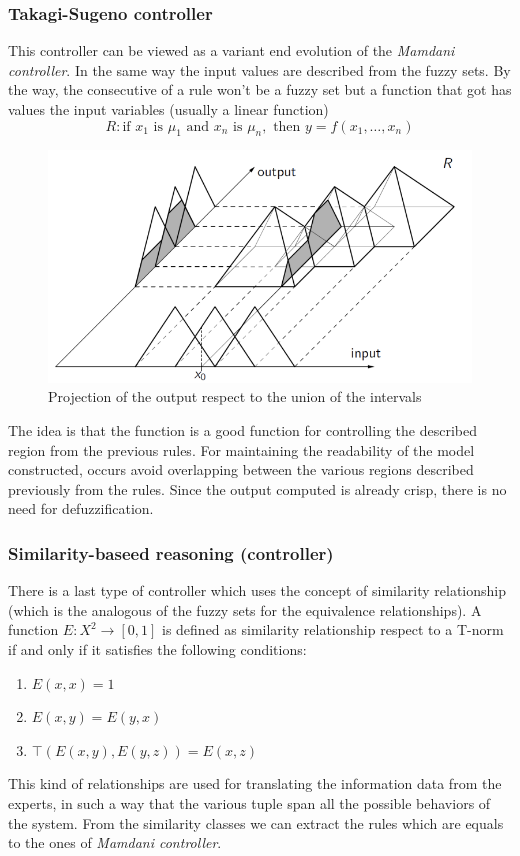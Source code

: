 \documentclass{article}
\begin{document}
\subsubsection{Takagi-Sugeno controller}
This controller can be viewed as a variant end evolution of the \textit{Mamdani controller}.
In the same way the input values are described from the fuzzy sets. By the way, the
consecutive of a rule won't be a fuzzy set but a function that got has values the
input variables (usually a linear function)
$$R:\text{if } x_1 \text{ is } \mu_1 \text{ and } x_n \text{ is }\mu_n,\text{ then }y=f(x_1,\dots,x_n)$$
\begin{figure}[H]
    \centering
    \includegraphics[scale=0.5]{images/takegi-sugeno.png}
    \caption{Projection of the output respect to the union of the intervals}
\end{figure}
The idea is that the function is a good function for controlling the described region from the
previous rules. For maintaining the readability of the model constructed, occurs avoid
overlapping between the various regions described previously from the rules. Since the output
computed is already crisp, there is no need for defuzzification.

\subsubsection{Similarity-baseed reasoning (controller)}
There is a last type of controller which uses the concept of similarity relationship (which
is the analogous of the fuzzy sets for the equivalence relationships).
\newline\newline
A function $E:X^2\rightarrow[0,1]$ is defined as similarity relationship respect to a T-norm
if and only if it satisfies the following conditions:
\begin{enumerate}
    \item $E(x,x)=1$
    \item $E(x,y)=E(y,x)$
    \item $\top (E(x,y),E(y,z))=E(x,z)$
\end{enumerate}
This kind of relationships are used for translating the information data from the experts, in
such a way that the various tuple span all the possible behaviors of the system. From the
similarity classes we can extract the rules which are equals to the ones of \textit{Mamdani controller}.
\end{document}
